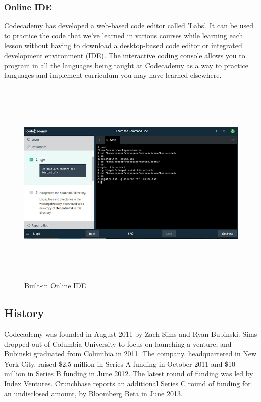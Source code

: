 \subsubsection {Online IDE}
Codecademy has developed a web-based code editor called 'Labs'. It can be used to practice the code that we've learned in various courses while learning each lesson without having to download a desktop-based code editor or integrated development environment (IDE). The interactive coding console allows you to program in all the languages being taught at Codecademy as a way to practice languages and implement curriculum you may have learned elsewhere.

\begin{figure}[h]
\label{ss}    %
\centering
\includegraphics[width= 15 cm,height=10cm]{ide.jpg}
\caption{Built-in Online IDE}
\end{figure}

\subsection{History}

Codecademy was founded in August 2011 by Zach Sims and Ryan Bubinski. Sims dropped out of Columbia University to focus on launching a venture, and Bubinski graduated from Columbia in 2011. The company, headquartered in New York City, raised \$2.5 million in Series A funding in October 2011 and \$10 million in Series B funding in June 2012. The latest round of funding was led by Index Ventures. Crunchbase reports an additional Series C round of funding for an undisclosed amount, by Bloomberg Beta in June 2013.

